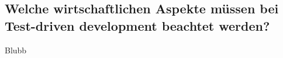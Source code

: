 \subsection{Welche wirtschaftlichen Aspekte müssen bei Test-driven development beachtet werden?}\label{diskussion:wirtschaft}

Blubb
